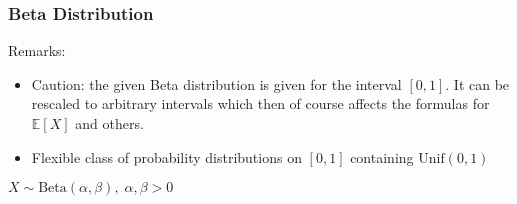 \subsubsection{Beta Distribution}
Remarks:
\begin{itemize}
    \item Caution: the given Beta distribution is given for the interval $[0,1]$. It can be rescaled to arbitrary intervals which then of course affects the formulas for $\mathbb{E}[X]$ and others.
    \item Flexible class of probability distributions on $[0,1]$ containing $\text{Unif}(0,1)$
\end{itemize}
$X \sim \mathrm{Beta}(\alpha, \beta), \;\alpha, \beta>0$\\
\renewcommand{\arraystretch}{1.3}
\setlength{\oldtabcolsep}{\tabcolsep}\setlength\tabcolsep{3pt}
